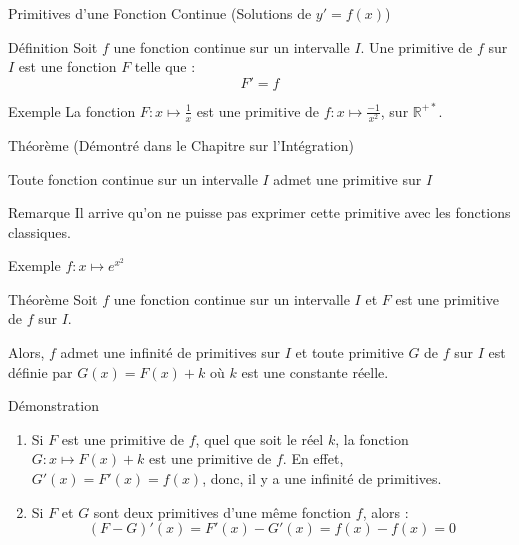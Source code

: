 \documentclass{cours}
\begin{document}
    \begin{Gpartie}{Primitives d'une Fonction Continue \big(Solutions de $y'=f(x)$\big)} 
        \begin{Spartie}{Définition} 
            Soit $f$ une fonction continue sur un intervalle $I$. Une primitive de $f$ sur $I$ est une fonction $F$ telle que :
            \[F'=f\]
        \end{Spartie}
        \begin{Spartie}{Exemple} 
            La fonction $F:x\mapsto\frac{1}{x}$ est une primitive de $f:x\mapsto\frac{-1}{x^2}$, sur $\mathbb{R^{+*}}$.
        \end{Spartie}
        \begin{Spartie}{Théorème} 
            (Démontré dans le Chapitre sur l'Intégration)

            Toute fonction continue sur un intervalle $I$ admet une primitive sur $I$
        \end{Spartie}
        \begin{Spartie}{Remarque} 
            Il arrive qu'on ne puisse pas exprimer cette primitive avec les fonctions classiques.
            \begin{SSpartie}{Exemple} 
                $f:x\mapsto e^{x^2}$
            \end{SSpartie}
        \end{Spartie}
        \begin{Spartie}{Théorème} 
            Soit $f$ une fonction continue sur un intervalle $I$ et $F$ est une primitive de $f$ sur $I$.

            Alors, $f$ admet une infinité de primitives sur $I$\textsuperscript{\raisebox{.5pt}{\textcircled{\raisebox{-.9pt}{1}}}} et toute primitive $G$ de $f$ sur $I$ est définie par $G(x)=F(x)+k$\textsuperscript{\raisebox{.5pt}{\textcircled{\raisebox{-.9pt}{2}}}} où $k$ est une constante réelle.

            \begin{SSpartie}{Démonstration} 
                \begin{enumerate}
                    \item Si $F$ est une primitive de $f$, quel que soit le réel $k$, la fonction $G:x\mapsto F(x)+k$ est une primitive de $f$. En effet, $G'(x)=F'(x)=f(x)$, donc, il y a une infinité de primitives.
                    \item Si $F$ et $G$ sont deux primitives d'une même fonction $f$, alors :
                    \[(F-G)'(x)=F'(x)-G'(x)=f(x)-f(x)=0\]
    

\end{enumerate}
\end{SSpartie}
\end{Spartie}
\end{Gpartie}
\end{document}
